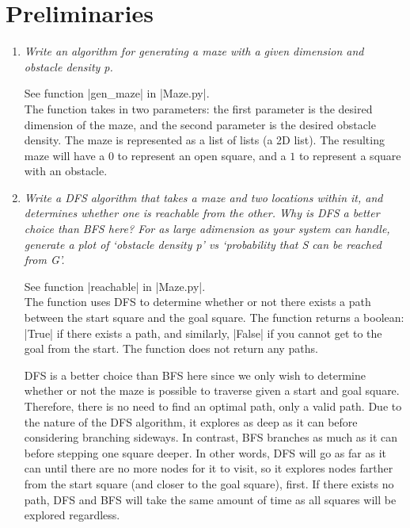 \documentclass[12pt, twoside]{article}
\begin{document}
\section{Preliminaries}
\begin{enumerate}
    \item 
        \textit{Write an algorithm for generating a maze with a given dimension and obstacle density p.}
        
        \vspace{4mm}
        See function \cverb|gen_maze| in \cverb|Maze.py|. \\
        The function takes in two parameters: the first parameter is the desired dimension of the maze, and the second parameter is the desired obstacle density. The maze is represented as a list of lists (a 2D list). The resulting maze will have a $0$ to represent an open square, and a $1$ to represent a square with an obstacle. 

    \item 
        \textit{Write  a  DFS  algorithm  that  takes  a  maze  and  two  locations  within  it,  and             determines whether  one  is  reachable  from  the  other.  Why  is  DFS  a  better  choice  than  BFS  here?  For  as  large  adimension as your system can handle,  generate a plot of ‘obstacle density p’ vs ‘probability that S can be reached from G’.}

        \vspace{4mm}
        See function \cverb|reachable| in \cverb|Maze.py|. \\
        The function uses DFS to determine whether or not there exists a path between the start square and the goal square. The function returns a boolean: \cverb|True| if there exists a path, and similarly, \cverb|False| if you cannot get to the goal from the start. The function does not return any paths.

        \vspace{4mm}
        DFS is a better choice than BFS here since we only wish to determine whether or not the maze is possible to traverse given a start and goal square. Therefore, there is no need to find an optimal path, only a valid path. Due to the nature of the DFS algorithm, it explores as deep as it can before considering branching sideways. In contrast, BFS branches as much as it can before stepping one square deeper. In other words, DFS will go as far as it can until there are no more nodes for it to visit, so it explores nodes farther from the start square (and closer to the goal square), first. If there exists no path, DFS and BFS will take the same amount of time as all squares will be explored regardless.
        

\end{enumerate}
\end{document}
